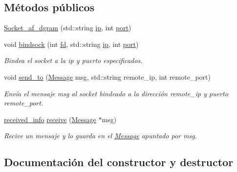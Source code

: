 \subsection*{Métodos públicos}
\begin{DoxyCompactItemize}
\item 
\hyperlink{classSocket__af__dgram_a11391f68bb56dafa6be879f388e4b0cd}{Socket\+\_\+af\+\_\+dgram} (std\+::string \hyperlink{classSocket__base_aed490170422026c6dfe5def12031cd04}{ip}, int \hyperlink{classSocket__base_afcdd7ae81a9fb867d012b7db8c259576}{port})
\item 
void \hyperlink{classSocket__af__dgram_a6a2084d50ab117b0bf6b699aa0573db5}{bindsock} (int \hyperlink{classSocket__base_a740aedbac3269e4981732dd6842cd9c2}{fd}, std\+::string \hyperlink{classSocket__base_aed490170422026c6dfe5def12031cd04}{ip}, int \hyperlink{classSocket__base_afcdd7ae81a9fb867d012b7db8c259576}{port})
\begin{DoxyCompactList}\small\item\em Bindea el socket a la ip y puerto especificados. \end{DoxyCompactList}\item 
void \hyperlink{classSocket__af__dgram_a744bb661eeebe5b5cdfca0028da6bd88}{send\+\_\+to} (\hyperlink{structMessage}{Message} msg, std\+::string remote\+\_\+ip, int remote\+\_\+port)
\begin{DoxyCompactList}\small\item\em Envía el mensaje {\itshape msg} al socket bindeado a la dirección {\itshape remote\+\_\+ip} y puerto {\itshape remote\+\_\+port}. \end{DoxyCompactList}\item 
\hyperlink{structreceived__info}{received\+\_\+info} \hyperlink{classSocket__af__dgram_a35d37ff27ecbb87d2e0ca12dae78b67c}{receive} (\hyperlink{structMessage}{Message} $\ast$msg)
\begin{DoxyCompactList}\small\item\em Recive un mensaje y lo guarda en el \hyperlink{structMessage}{Message} apuntado por {\itshape msg}. \end{DoxyCompactList}\end{DoxyCompactItemize}


\subsection{Documentación del constructor y destructor}
\mbox{\label{classSocket__af__dgram_a11391f68bb56dafa6be879f388e4b0cd}} 
